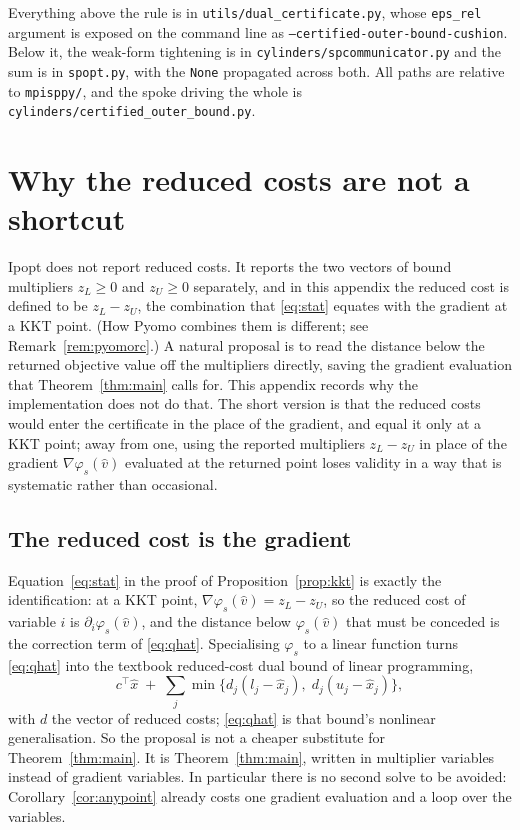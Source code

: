 \documentclass[11pt]{article}
\theoremstyle{plain}
\theoremstyle{remark}
\newcommand{\vhat}{\hat{v}}
\begin{document}
\noindent
Everything above the rule is in \texttt{utils/dual\_certificate.py},
whose \texttt{eps\_rel} argument is exposed on the command line as
\texttt{--certified-outer-bound-cushion}.  Below it, the weak-form tightening is in
\texttt{cylinders/spcommunicator.py} and the sum is in \texttt{spopt.py}, with
the \texttt{None} propagated across both.  All paths are relative to
\texttt{mpisppy/}, and the spoke driving the whole is
\texttt{cylinders/certified\_outer\_bound.py}.

\appendix

\section{Why the reduced costs are not a shortcut}\label{sec:reducedcost}

Ipopt does not report reduced costs.  It reports the two vectors of bound
multipliers $z_L \ge 0$ and $z_U \ge 0$ separately, and in this appendix the
reduced cost is defined to be $z_L - z_U$, the combination that
\eqref{eq:stat} equates with the gradient at a KKT point.  (How Pyomo combines
them is different; see Remark~\ref{rem:pyomorc}.)  A natural proposal is to
read the distance below the returned objective value off the multipliers
directly, saving the gradient
evaluation that Theorem~\ref{thm:main} calls for.  This appendix records why the
implementation does not do that.  The short version is that the reduced costs
would enter the certificate in the place of the gradient, and equal it only at a
KKT point; away from one, using the reported multipliers
$z_L - z_U$ in place of the gradient $\nabla \varphi_s(\vhat)$ evaluated at the
returned point loses validity in a way that is systematic rather than
occasional.

\subsection{The reduced cost is the gradient}

Equation~\eqref{eq:stat} in the proof of Proposition~\ref{prop:kkt} is exactly
the identification: at a KKT point,
$\nabla \varphi_s(\vhat) = z_L - z_U$, so the reduced cost of variable $i$ is
$\partial_i \varphi_s(\vhat)$, and the distance below $\varphi_s(\vhat)$ that
must be conceded is the correction term of \eqref{eq:qhat}.  Specialising
$\varphi_s$ to a linear function turns \eqref{eq:qhat} into the textbook
reduced-cost dual bound of linear programming,
\[
  c^{\top}\hat{x} \;+\; \sum_{j} \min\bigl\{ d_j (l_j - \hat{x}_j),\;
                                             d_j (u_j - \hat{x}_j) \bigr\},
\]
with $d$ the vector of reduced costs; \eqref{eq:qhat} is that bound's nonlinear
generalisation.  So the proposal is not a cheaper substitute for
Theorem~\ref{thm:main}.  It is Theorem~\ref{thm:main}, written in multiplier
variables instead of gradient variables.  In particular there is no second solve
to be avoided: Corollary~\ref{cor:anypoint} already costs one gradient
evaluation and a loop over the variables.
\end{document}
